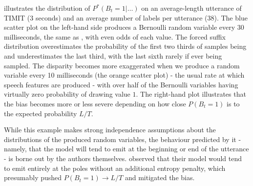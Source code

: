 \documentclass{article}
\begin{document}
 illustrates the distribution of $P^*(B_t=1|\ldots)$ on an
average-length utterance of TIMIT (3 seconds) and an average number of labels
per utterance (38). The blue scatter plot on the left-hand side produces a
Bernoulli random variable every 30 milliseconds, the same as
\citet{luoLearningOnlineAlignments2017}, with even odds of each value. The
forced suffix distribution overestimates the probability of the first two
thirds of samples being and underestimates the last third, with the last sixth
rarely if ever being sampled. The disparity becomes more exaggerated when we
produce a random variable every 10 milliseconds (the orange scatter plot) -
the usual rate at which speech features are produced - with over half of the
Bernoulli variables having virtually zero probability of drawing value $1$. The
right-hand plot illustrates that the bias becomes more or less severe depending
on how close $P(B_t=1)$ is to the expected probability $L / T$.

While this example makes strong independence assumptions about the
distributions of the produced random variables, the behaviour predicted by it -
namely, that the model will tend to emit at the beginning or end of the
utterance - is borne out by the authors themselves.
\citet{luoLearningOnlineAlignments2017} observed that their model would tend to
emit entirely at the poles without an additional entropy penalty, which
presumably pushed $P(B_t=1) \to L / T$ and mitigated the bias.


\end{document}
